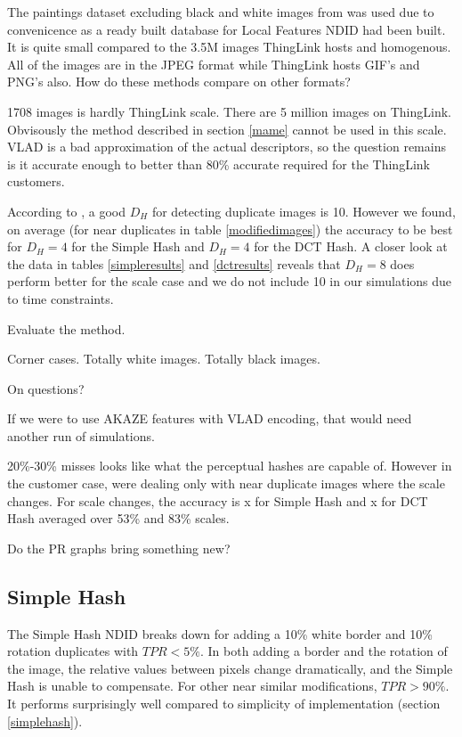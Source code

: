 \documentclass[english,12pt,a4paper,pdftex,elec,utf8]{aaltothesis}
\begin{document}
The paintings dataset excluding black and white images from \cite{Vedaldi2012} was used due to convenicence as a ready built database for Local Features NDID had been built. It is quite small compared to the 3.5M images ThingLink hosts and homogenous. All of the images are in the JPEG format while ThingLink hosts GIF's and PNG's also. How do these methods compare on other formats?

1708 images is hardly ThingLink scale. There are 5 million images on ThingLink. Obvisously the method described in section \ref{mame} cannot be used in this scale. VLAD is a bad approximation of the actual descriptors, so the question remains is it accurate enough to better than 80\% accurate required for the ThingLink customers.

According to \cite{Zauner2010}, a good $D_H$ for detecting duplicate images is 10. However we found, on average (for near duplicates in table \ref{modifiedimages}) the accuracy to be best for $D_H = 4$ for the Simple Hash and $D_H = 4$ for the DCT Hash. A closer look at the data in tables \ref{simpleresults} and \ref{dctresults} reveals that $D_H = 8$ does perform better for the scale case and we do not include 10 in our simulations due to time constraints.

Evaluate the method.


Corner cases.
Totally white images. Totally black images.

On questions?

If we were to use AKAZE features with VLAD encoding, that would need another run of simulations.

20\%-30\% misses looks like what the perceptual hashes are capable of. However in the customer case, were dealing only with near duplicate images where the scale changes. For scale changes, the accuracy is x for Simple Hash and x for DCT Hash averaged over 53\% and 83\% scales.

Do the PR graphs bring something new?

\subsection{Simple Hash}
The Simple Hash NDID breaks down for adding a 10\% white border and 10\% rotation duplicates with $TPR < 5\%$. In both adding a border and the rotation of the image, the relative values between pixels change dramatically, and the Simple Hash is unable to compensate. For other near similar modifications, $TPR > 90\%$. It performs surprisingly well compared to simplicity of implementation (section \ref{simplehash}).
\end{document}

